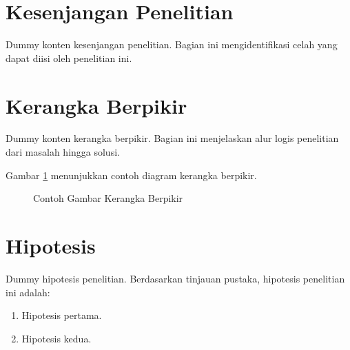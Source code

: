 \section{Kesenjangan Penelitian}
\label{sec:kesenjangan}

Dummy konten kesenjangan penelitian. Bagian ini mengidentifikasi celah yang dapat diisi oleh penelitian ini.

\section{Kerangka Berpikir}
\label{sec:kerangka_berpikir}

Dummy konten kerangka berpikir. Bagian ini menjelaskan alur logis penelitian dari masalah hingga solusi.

Gambar \ref{fig:contoh_gambar} menunjukkan contoh diagram kerangka berpikir.

\begin{figure}[h]
    \centering
    \caption{Contoh Gambar Kerangka Berpikir}
    \label{fig:contoh_gambar}
\end{figure}

\section{Hipotesis}
\label{sec:hipotesis}

Dummy hipotesis penelitian. Berdasarkan tinjauan pustaka, hipotesis penelitian ini adalah:

\begin{enumerate}
    \item Hipotesis pertama.
    \item Hipotesis kedua.
\end{enumerate}